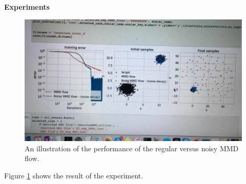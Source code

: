 











%
%
%
% 
%
%
%
\textbf{Experiments}


\begin{figure}[ht]
	\centering
	\includegraphics[width=0.5\linewidth]{experiments.jpg}
	\caption{An illustration of the performance of the regular versus noisy MMD flow.}
	\label{fig:experiments}
\end{figure}

Figure \ref{fig:experiments} shows the result of the experiment.









